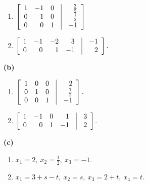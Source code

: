  \begin{enumerate}
\item $ \left [ \begin{array}{rrrcr}
                    1&-1&0&\vline&\frac{3}{2}\\
                    0&1&0&\vline&\frac{1}{2}\\
                    0&0&1&\vline&-1 \end{array} \right ]$
\item $\left [ \begin{array}{rrrrcr} 1 &-1 &-2&3&\vline&-1\\
0&0&1&
-1&\vline&2
\end{array} \right ].$
\end{enumerate}
{\bf (b)} \begin{enumerate}
\item $ \left [ \begin{array}{rrrcr}
                    1&0&0&\vline&2\\
                    0&1&0&\vline&\frac{1}{2}\\
                    0&0&1&\vline&-1 \end{array} \right ].$
\item $\left [ \begin{array}{rrrrcr} 1&-1&0&1&\vline&3\\0&0&1&-1&\vline&2
\end{array} \right ]$.
\end{enumerate}
{\bf (c)} \begin{enumerate}
\item $x_1=2,\ x_2=\frac{1}{2}, \ x_3=-1$.
\item $x_1=3+s-t, \ x_2=s, \ x_3=2+t, \ x_4=t$.
\end{enumerate}

\bigskip


